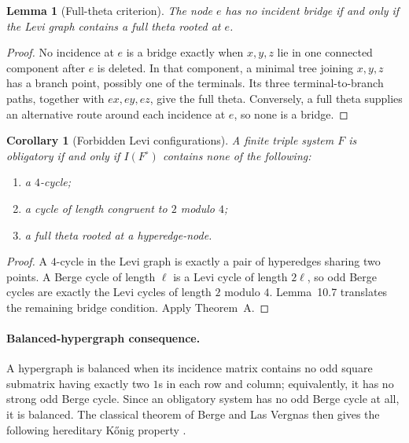 \documentclass[a4paper,11pt,reqno]{amsart}
\theoremstyle{plain}
\newtheorem{lemma}[theorem]{Lemma}
\newtheorem{corollary}[theorem]{Corollary}
\theoremstyle{definition}
\theoremstyle{remark}
\begin{document}
\begin{lemma}[Full-theta criterion]\label{lemma-10.7-full-theta-criterion}
The node $e$ has no incident bridge if and only if the Levi graph contains a
full theta rooted at $e$.
\end{lemma}

\begin{proof}
No incidence at $e$ is a bridge exactly when $x,y,z$ lie in one connected
component after $e$ is deleted.  In that component, a minimal tree joining
$x,y,z$ has a branch point, possibly one of the terminals.  Its three
terminal-to-branch paths, together with $ex,ey,ez$, give the full theta.
Conversely, a full theta supplies an alternative route around each incidence
at $e$, so none is a bridge.
\end{proof}

\begin{corollary}[Forbidden Levi configurations]\label{corollary-10.8-forbidden-levi-configurations}
A finite triple system $F$ is obligatory if and only if $I(F^\circ)$ contains
none of the following:
\begin{enumerate}
\item a $4$-cycle;
\item a cycle of length congruent to $2$ modulo $4$;
\item a full theta rooted at a hyperedge-node.
\end{enumerate}
\end{corollary}

\begin{proof}
A $4$-cycle in the Levi graph is exactly a pair of hyperedges sharing two
points.  A Berge cycle of length $\ell$ is a Levi cycle of length $2\ell$, so
odd Berge cycles are exactly the Levi cycles of length $2$ modulo $4$.
Lemma~10.7 translates the remaining bridge condition.  Apply Theorem~A.
\end{proof}

\paragraph{Balanced-hypergraph consequence.}
A hypergraph is balanced when its incidence matrix contains no odd square
submatrix having exactly two $1$s in each row and column; equivalently, it has
no strong odd Berge cycle.  Since an obligatory system has no odd Berge cycle
at all, it is balanced.  The classical theorem of Berge and Las Vergnas then
gives the following hereditary K\H{o}nig property
\citep{bergelasvergnas1970,berge1972}.
\end{document}
